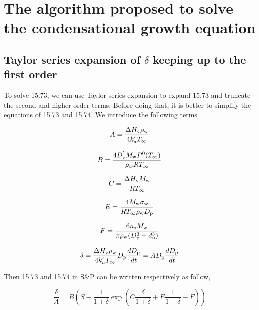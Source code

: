 \documentclass[12pt]{article}
\begin{document}
{%
\section{The algorithm proposed to solve the condensational growth equation}
\subsection{Taylor series expansion of $\delta$ keeping up to the first order}

To solve 15.73, we can use Taylor series expansion to expand 15.73 and truncate the second and higher order terms. Before doing that, it is better to simplify the equations of 15.73 and 15.74. We introduce the following terms.

\begin{equation}
A=\frac{\Delta H_{\rm v} \rho_{\rm w}}{4 k_{\rm a}^{'} T_{\infty}}
\end{equation}

\begin{equation}
B=\frac{4 D_{\rm v}^{'} M_{\rm w} P^{\rm 0}(T_{\infty})}{\rho_w R T_{\infty}}
\end{equation}

\begin{equation}
C=\frac{\Delta H_{\rm v} M_{\rm w}}{R T_{\infty}}
\end{equation}

\begin{equation}
E=\frac{4 M_{\rm w}\sigma_{\rm w}}{R T_{\infty} \rho_{\rm w} D_{\rm p}}
\end{equation}

\begin{equation}
F=\frac{6 n_{\rm s} M_{\rm w}}{\pi \rho_{\rm w} (D_{\rm p}^{3}-d_{\rm u}^{3})}
\end{equation}

\begin{equation}\label{eqn:23}
\delta=\frac{\Delta H_{\rm v} \rho_{\rm w}}{4 k_a^{'} T_{\infty}} D_{\rm p} \frac{d D_{\rm p}}{dt}=A D_{\rm p} \frac{d D_{\rm p}}{dt}
\end{equation}

Then 15.73 and 15.74 in S\&P can be written respectively as follow,

\begin{equation}\label{eqn:15.73}
\frac{\delta}{A}=B(S-\frac{1}{1+\delta}\exp(C\frac{\delta}{1+\delta}+E \frac{1}{1+\delta}-F))
\end{equation}

}
\end{document}
